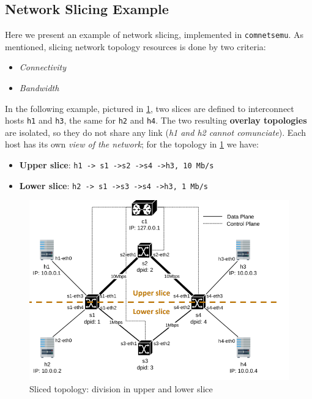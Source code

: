 \documentclass[10pt,a4paper]{report}
\theoremstyle{definition}
\begin{document}
\subsection{Network Slicing Example}
Here we present an example of network slicing, implemented in \texttt{comnetsemu}. As mentioned, slicing network topology resources is done by two criteria:
\begin{itemize}
 \item \textit{Connectivity}
 \item \textit{Bandwidth}
\end{itemize}
In the following example, pictured in \ref{comnetsemu-topology}, two slices are defined to interconnect hosts \texttt{h1} and \texttt{h3}, the same for \texttt{h2} and \texttt{h4}. The two resulting \textbf{overlay topologies} are isolated, so they do not share any link (\textit{h1 and h2 cannot comunciate}). Each host has its own \textit{view of the network}; for the topology in \ref{comnetsemu-topology} we have:
\begin{itemize}
	\item \textbf{Upper slice}: \texttt{h1
		-> s1
		->s2
		->s4
		->h3, 10 Mb/s}
	\item \textbf{Lower slice}: \texttt{h2
		-> s1
		->s3
		->s4
		->h3, 1 Mb/s}
\end{itemize}
\begin{figure}[h]
	\centering\includegraphics[scale=0.50]{images/Pasted image 20230531155544.png}
	\caption{Sliced topology: division in upper and lower slice}
	\label{comnetsemu-topology}
\end{figure}
\end{document}
